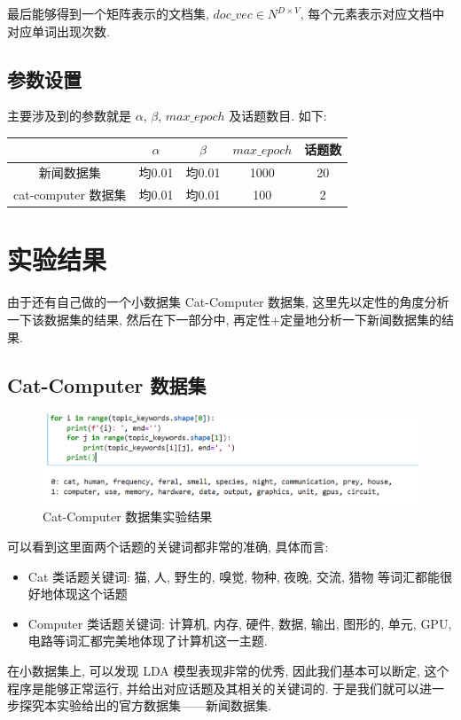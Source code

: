 \documentclass[UTF8]{article}
\begin{document}
最后能够得到一个矩阵表示的文档集, $doc\_vec \in N^{D\times V}$, 每个元素表示对应文档中对应单词出现次数.

\subsection{参数设置}
主要涉及到的参数就是 $\alpha$, $\beta$, $max\_epoch$ 及话题数目. 如下:
\begin{center}
\begin{tabular}{|c|c|c|c|c|}
\hline
 & $\alpha$ & $\beta$ & $max\_epoch$ & 话题数 \\
\hline
新闻数据集 & 均0.01 & 均0.01 & 1000 & 20 \\
\hline
cat-computer 数据集 & 均0.01 & 均0.01 & 100 & 2 \\
\hline
\end{tabular}
\end{center}
\section{实验结果}
由于还有自己做的一个小数据集 Cat-Computer 数据集, 这里先以定性的角度分析一下该数据集的结果, 然后在下一部分中, 再定性+定量地分析一下新闻数据集的结果.
\subsection{Cat-Computer 数据集}
\begin{center}
\begin{figure}[H]
	\centering
	\includegraphics[width=\linewidth]{image/ccresult.png}
	\caption{Cat-Computer 数据集实验结果}
\end{figure}
\end{center}
可以看到这里面两个话题的关键词都非常的准确, 具体而言:
\begin{itemize}
\item Cat 类话题关键词: 猫, 人, 野生的, 嗅觉, 物种, 夜晚, 交流, 猎物 等词汇都能很好地体现这个话题
\item Computer 类话题关键词: 计算机, 内存, 硬件, 数据, 输出, 图形的, 单元, GPU, 电路等词汇都完美地体现了计算机这一主题.
\end{itemize}
在小数据集上, 可以发现 LDA 模型表现非常的优秀, 因此我们基本可以断定, 这个程序是能够正常运行, 并给出对应话题及其相关的关键词的. 于是我们就可以进一步探究本实验给出的官方数据集——新闻数据集.
\end{document}
